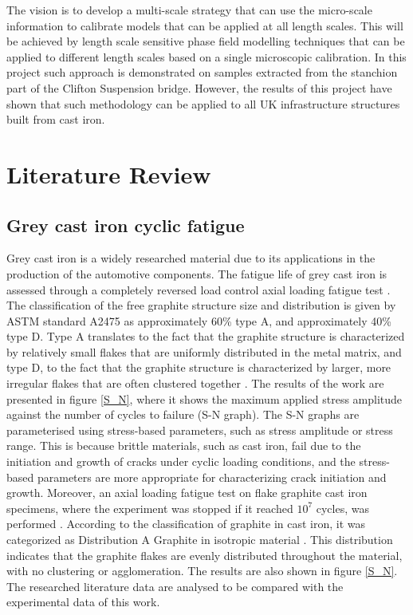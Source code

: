 \documentclass[11pt,a4paper]{article}
\begin{document}
\noindent The vision is to develop a multi-scale strategy that can use the micro-scale information to calibrate models that can be applied at all length scales. This will be achieved by length scale sensitive phase field modelling techniques that can be applied to different length scales based on a single microscopic calibration. In this project such approach is demonstrated on samples extracted from the stanchion part of the Clifton Suspension bridge. However, the results of this project have shown that such methodology can be applied to all UK infrastructure structures built from cast iron.

\section{Literature Review}
\subsection{Grey cast iron cyclic fatigue}
Grey cast iron is a widely researched material due to its applications in the production of the automotive components. The fatigue life of grey cast iron is assessed through a completely reversed load control axial loading fatigue test \cite{fash1982fatigue}. The classification of the free graphite structure size and distribution is given by ASTM standard A2475 as approximately 60\% type A, and approximately 40\% type D. Type A translates to the fact that the graphite structure is characterized by relatively small flakes that are uniformly distributed in the metal matrix, and type D, to the fact that the graphite structure is characterized by larger, more irregular flakes that are often clustered together \cite{ASTM:A247}. The results of the work are presented in figure \ref{S_N}, where it shows the maximum applied stress amplitude against the number of cycles to failure (S-N graph). The S-N graphs are parameterised using stress-based parameters, such as stress amplitude or stress range. This is because brittle materials, such as cast iron, fail due to the initiation and growth of cracks under cyclic loading conditions, and the stress-based parameters are more appropriate for characterizing crack initiation and growth. Moreover, an axial loading fatigue test on flake graphite cast iron specimens, where the experiment was stopped if it reached $10^7$ cycles, was performed \cite{shirato2018study}. According to the classification of graphite in cast iron, it was categorized as Distribution A Graphite in isotropic material \cite{ASTM:A247}. This distribution indicates that the graphite flakes are evenly distributed throughout the material, with no clustering or agglomeration. The results are also shown in figure \ref{S_N}. The researched literature data are analysed to be compared with the experimental data of this work.
\end{document}
